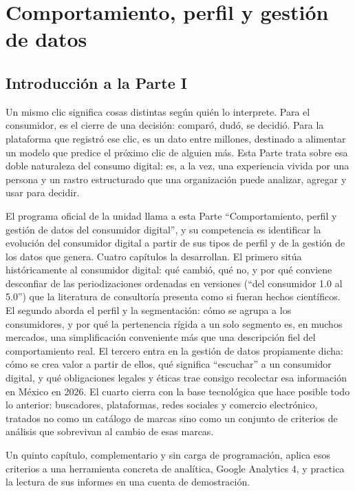 \part{Comportamiento, perfil y gestión de datos}

\chapter*{Introducción a la Parte I}

Un mismo clic significa cosas distintas según quién lo interprete. Para el
consumidor, es el cierre de una decisión: comparó, dudó, se decidió. Para la
plataforma que registró ese clic, es un dato entre millones, destinado a
alimentar un modelo que predice el próximo clic de alguien más. Esta Parte
trata sobre esa doble naturaleza del consumo digital: es, a la vez, una
experiencia vivida por una persona y un rastro estructurado que una
organización puede analizar, agregar y usar para decidir.

El programa oficial de la unidad llama a esta Parte \enquote{Comportamiento, perfil y
gestión de datos del consumidor digital}, y su competencia es identificar la
evolución del consumidor digital a partir de sus tipos de perfil y de la
gestión de los datos que genera. Cuatro capítulos la desarrollan. El primero
sitúa históricamente al consumidor digital: qué cambió, qué no, y por qué
conviene desconfiar de las periodizaciones ordenadas en versiones (\enquote{del
consumidor 1.0 al 5.0}) que la literatura de consultoría presenta como si
fueran hechos científicos. El segundo aborda el perfil y la segmentación:
cómo se agrupa a los consumidores, y por qué la pertenencia rígida a un solo
segmento es, en muchos mercados, una simplificación conveniente más que una
descripción fiel del comportamiento real. El tercero entra en la gestión de
datos propiamente dicha: cómo se crea valor a partir de ellos, qué significa
\enquote{escuchar} a un consumidor digital, y qué obligaciones legales y éticas trae
consigo recolectar esa información en México en 2026. El cuarto cierra con la
base tecnológica que hace posible todo lo anterior: buscadores, plataformas,
redes sociales y comercio electrónico, tratados no como un catálogo de marcas
sino como un conjunto de criterios de análisis que sobrevivan al cambio de
esas marcas.

Un quinto capítulo, complementario y sin carga de programación, aplica esos criterios a una herramienta concreta de analítica, Google Analytics 4, y practica la lectura de sus informes en una cuenta de demostración.

